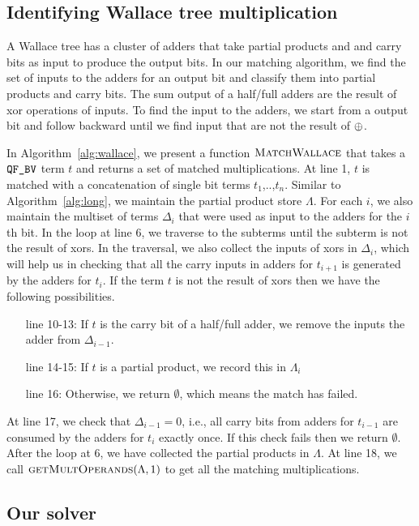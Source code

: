 \subsection{Identifying Wallace tree multiplication}


A Wallace tree has a cluster of adders that take partial products and 
and carry bits as input to produce the output bits.
%
In our matching algorithm, we find the set of inputs
to the adders for an output bit and classify them into
partial products and carry bits.
%
The sum output of a half/full adders are the result of 
xor operations of inputs.
%
To find the input to the adders, we start from a
output bit and follow backward until we find input that
are not the result of $\oplus$.

In Algorithm~\ref{alg:wallace}, we present a function
$\textsc{MatchWallace}$ that takes a $\texttt{QF\_BV}$ term $t$ and returns a
set of matched multiplications.
%
At line 1, $t$ is matched with a concatenation of single bit terms $t_1$,..,$t_n$.
%
Similar to Algorithm~\ref{alg:long},
we maintain the partial product store $\Lambda$.
%
For each $i$,
we also maintain the multiset of terms $\Delta_i$ that were used as 
input to the adders for the $i$th bit.
%
In the loop at line 6, we traverse to the subterms until
the subterm is not the result of xors.
%
In the traversal, we also collect the inputs of xors in $\Delta_i$, which
will help us in checking that all the carry inputs in adders for $t_{i+1}$
is generated by the adders for $t_i$.
%
If the term $t$ is not the result of xors then
we have the following possibilities.
%
\begin{itemize}
\item[line 10-13:]
  If $t$ is the carry bit of a half/full adder, we remove the inputs 
  the adder from $\Delta_{i-1}$.
\item[line 14-15:] If $t$ is a partial product, we record this in $\Lambda_i$
\item[line 16:] Otherwise, we return $\emptyset$, which means the match has failed.
\end{itemize}
At line 17, we check that $\Delta_{i-1} = 0$, i.e., all carry bits from
adders for $t_{i-1}$ are consumed by the adders for $t_i$ exactly once.
%
If this check fails then we return $\emptyset$.
%
After the loop at 6, we have collected the partial products in $\Lambda$.
%
At line 18, we call $\textsc{getMultOperands}(\Lambda,1)$ to get all
the matching multiplications.

\subsection{Our solver}


